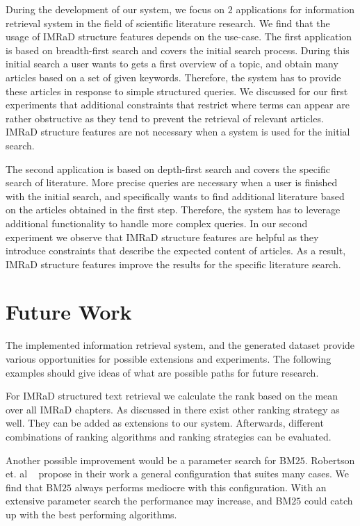 During the development of our system, we focus on $2$ applications for information retrieval system in the field of scientific literature research. We find that the usage of IMRaD structure features depends on the use-case. The first application is based on breadth-first search and covers the initial search process. During this initial search a user wants to gets a first overview of a topic, and obtain many articles based on a set of given keywords. Therefore, the system has to provide these articles in response to simple structured queries. We discussed for our first experiments that additional constraints that restrict where terms can appear are rather obstructive as they tend to prevent the retrieval of relevant articles. IMRaD structure features are not necessary when a system is used for the initial search.

The second application is based on depth-first search and covers the specific search of literature. More precise queries are necessary when a user is finished with the initial search, and specifically wants to find additional literature based on the articles obtained in the first step. Therefore, the system has to leverage additional functionality to handle more complex queries. In our second experiment we observe that IMRaD structure features are helpful as they introduce constraints that describe the expected content of articles. As a result, IMRaD structure features improve the results for the specific literature search.

\section{Future Work}
\label{sec:future_work}

The implemented information retrieval system, and the generated dataset provide various opportunities for possible extensions and experiments. The following examples should give ideas of what are possible paths for future research.

For IMRaD structured text retrieval we calculate the rank based on the mean over all IMRaD chapters. As discussed in  there exist other ranking strategy as well. They can be added as extensions to our system. Afterwards, different combinations of ranking algorithms and ranking strategies can be evaluated. 

Another possible improvement would be a parameter search for BM$25$. Robertson et. al ~\cite{RobertsonWJHG94} propose in their work a general configuration that suites many cases. We find that BM$25$ always performs mediocre with this configuration. With an extensive parameter search the performance may increase, and BM$25$ could catch up with the best performing algorithms.

